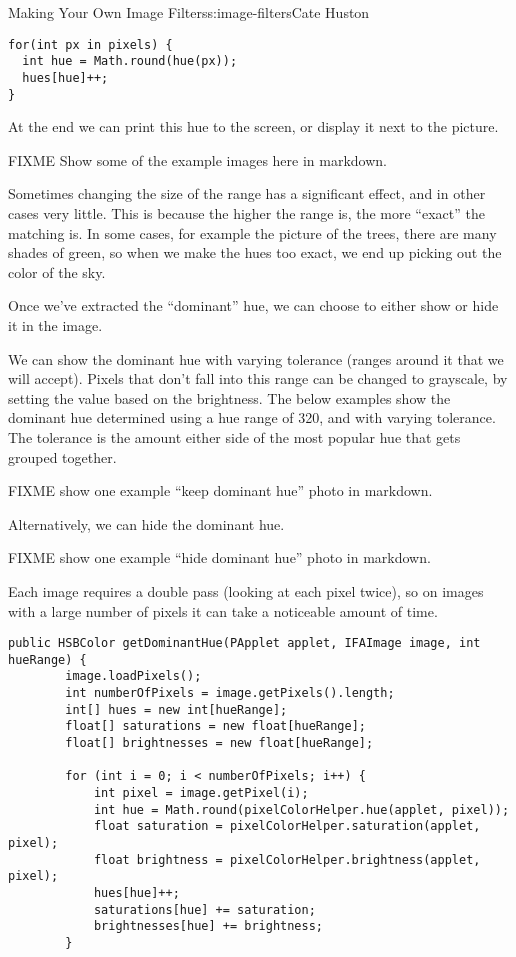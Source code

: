 \begin{aosachapter}{Making Your Own Image Filters}{s:image-filters}{Cate Huston}
\begin{verbatim}
for(int px in pixels) {
  int hue = Math.round(hue(px));
  hues[hue]++;
}
\end{verbatim}

At the end we can print this hue to the screen, or display it next to
the picture.

FIXME Show some of the example images here in markdown.

Sometimes changing the size of the range has a significant effect, and
in other cases very little. This is because the higher the range is, the
more ``exact'' the matching is. In some cases, for example the picture
of the trees, there are many shades of green, so when we make the hues
too exact, we end up picking out the color of the sky.

Once we've extracted the ``dominant'' hue, we can choose to either show
or hide it in the image.

We can show the dominant hue with varying tolerance (ranges around it
that we will accept). Pixels that don't fall into this range can be
changed to grayscale, by setting the value based on the brightness. The
below examples show the dominant hue determined using a hue range of
320, and with varying tolerance. The tolerance is the amount either side
of the most popular hue that gets grouped together.

FIXME show one example ``keep dominant hue'' photo in markdown.

Alternatively, we can hide the dominant hue.

FIXME show one example ``hide dominant hue'' photo in markdown.

Each image requires a double pass (looking at each pixel twice), so on
images with a large number of pixels it can take a noticeable amount of
time.

\begin{verbatim}
public HSBColor getDominantHue(PApplet applet, IFAImage image, int hueRange) {
        image.loadPixels();
        int numberOfPixels = image.getPixels().length;
        int[] hues = new int[hueRange];
        float[] saturations = new float[hueRange];
        float[] brightnesses = new float[hueRange];

        for (int i = 0; i < numberOfPixels; i++) {
            int pixel = image.getPixel(i);
            int hue = Math.round(pixelColorHelper.hue(applet, pixel));
            float saturation = pixelColorHelper.saturation(applet, pixel);
            float brightness = pixelColorHelper.brightness(applet, pixel);
            hues[hue]++;
            saturations[hue] += saturation;
            brightnesses[hue] += brightness;
        }


\end{verbatim}
\end{aosachapter}
